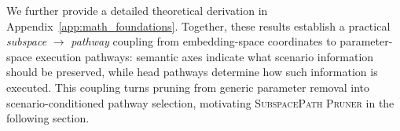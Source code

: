 We further provide a detailed theoretical derivation in Appendix~\ref{app:math_foundations}. Together, these results establish a practical \emph{subspace} $\rightarrow$ \emph{pathway} coupling from embedding-space coordinates to parameter-space execution pathways: semantic axes indicate what scenario information should be preserved, while head pathways determine how such information is executed. This coupling turns pruning from generic parameter removal into scenario-conditioned pathway selection, motivating \textsc{SubspacePath Pruner} in the following section.





